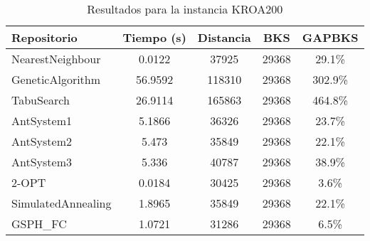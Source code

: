 \begin{table}[H]
\centering
\caption{Resultados para la instancia KROA200}
\begin{tabular}{|l|c|c|c|c|}
\hline
\textbf{Repositorio} & \textbf{Tiempo (s)} & \textbf{Distancia} & \textbf{BKS} & \textbf{GAPBKS} \\ 
\hline
NearestNeighbour & 0.0122 & 37925 & 29368 & 29.1\% \\ 
GeneticAlgorithm & 56.9592 & 118310 & 29368 & 302.9\% \\ 
TabuSearch & 26.9114 & 165863 & 29368 & 464.8\% \\ 
AntSystem1 & 5.1866 & 36326 & 29368 & 23.7\% \\ 
AntSystem2 & 5.473 & 35849 & 29368 & 22.1\% \\ 
AntSystem3 & 5.336 & 40787 & 29368 & 38.9\% \\ 
2-OPT & 0.0184 & 30425 & 29368 & 3.6\% \\ 
SimulatedAnnealing & 1.8965 & 35849 & 29368 & 22.1\% \\ 
GSPH_FC & 1.0721 & 31286 & 29368 & 6.5\% \\ 
\hline
\end{tabular}
\end{table}

